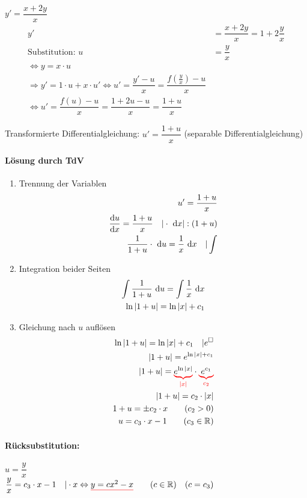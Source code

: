 \Bsp $y'=\dfrac{x+2y}{x}$
\begin{align*}
y'&=\dfrac{x+2y}{x}=1+2\dfrac{y}{x}\\
\text{Substitution: }u&=\dfrac{y}{x}\\
\Leftrightarrow y=x\cdot u\\
\Rightarrow y'=1\cdot u + x\cdot u'\Leftrightarrow u'=\dfrac{y'-u}{x}=\dfrac{f(\frac{y}{x})-u}{x}\\
\Leftrightarrow u'=\dfrac{f(u)-u}{x}=\dfrac{1+2u-u}{x}=\dfrac{1+u}{x}
\end{align*}

Transformierte Differentialgleichung: $u'=\dfrac{1+u}{x}$ (separable Differentialgleichung)

\paragraph{Lösung durch TdV}\quad
\begin{enumerate}
	\item Trennung der Variablen
	\begin{align*}
	u'=\dfrac{1+u}{x}\\
	\dfrac{\mathrm{d}u}{\mathrm{d}x}=\dfrac{1+u}{x}\quad|\cdot\ \mathrm{d}x|:(1+u)\\
	\dfrac{1}{1+u}\cdot\ \mathrm{d}u=\dfrac{1}{x}\ \mathrm{d}x\quad|\int
	\end{align*}
	\item Integration beider Seiten
	\begin{align*}
	\int\dfrac{1}{1+u}\ \mathrm{d}u=\int\dfrac{1}{x}\ \mathrm{d}x\\
	\ln|1+u|=\ln|x|+c_1
	\end{align*}
	\item Gleichung nach $u$ auflösen
	\begin{align*}
	\ln|1+u|=\ln|x|+c_1\quad|e^{\square}\\
	|1+u|=e^{\ln|x|+c_1}\\
	|1+u|=\redunderbrace{e^{\ln|x|}}{|x|}\cdot \redunderbrace{e^{c_1}}{c_2}\\
	|1+u|=c_2\cdot|x|\\
	1+u=\pm c_2\cdot x\qquad(c_2>0)\\
	u=c_3\cdot x-1\qquad(c_3\in\R)
	\end{align*}
\end{enumerate}

\paragraph{Rücksubstitution:} $u=\dfrac{y}{x}$\\
$\dfrac{y}{x}=c_3\cdot x-1\quad|\cdot x\Leftrightarrow \textcolor{red}{\underline{\textcolor{black}{y=cx^2-x}}}\qquad(c\in\mathbb{R})\quad(c=c_3)$

